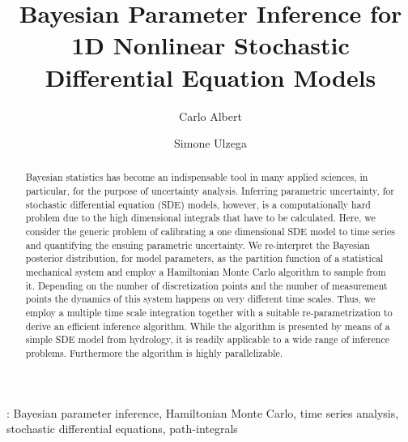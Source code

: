 \documentclass[12pt,a4paper,final]{iopart}
\begin{document}
\title[Parameter inference with stochastic models]{Bayesian Parameter Inference for 1D Nonlinear Stochastic Differential Equation Models}

\author[cor1]{Carlo Albert}%
\address{Eawag, Swiss Federal Institute of Aquatic Science and Technology, 8600 D\"ubendorf, Switzerland}

\author{Simone Ulzega}
\address{Eawag, Swiss Federal Institute of Aquatic Science and Technology, 8600 D\"ubendorf, Switzerland}



\begin{abstract}
Bayesian statistics has become an indispensable tool in many applied sciences, in particular, for the purpose of uncertainty analysis.
Inferring parametric uncertainty, for stochastic differential equation (SDE) models, however, is a computationally hard problem due to the high dimensional integrals that have to be calculated.
Here, we consider the generic problem of calibrating a one dimensional SDE model to time series and quantifying the ensuing parametric uncertainty.
We re-interpret the Bayesian posterior distribution, for model parameters, as the partition function of a statistical mechanical system and employ a Hamiltonian Monte Carlo algorithm to sample from it.
Depending on the number of discretization points and the number of measurement points the dynamics of this system happens on very different time scales.
Thus, we employ a multiple time scale integration together with a suitable re-parametrization to derive an efficient inference algorithm.
While the algorithm is presented by means of a simple SDE model from hydrology, it is readily applicable to a wide range of inference problems. Furthermore the algorithm is highly parallelizable.

\end{abstract}

\vspace{2pc}
: Bayesian parameter inference, Hamiltonian Monte Carlo, time series analysis, stochastic differential equations, path-integrals

\submitto{\NJP}
\end{document}
